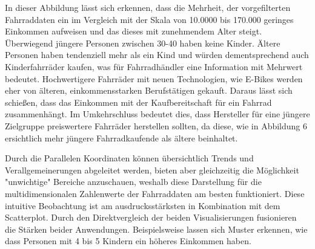 \documentclass[usegeometry=true]{scrartcl}
\begin{document}
\newline In dieser Abbildung lässt sich erkennen, dass die Mehrheit, der vorgefilterten Fahrraddaten ein im Vergleich mit der Skala von 10.0000 bis 170.000 geringes Einkommen aufweisen und das dieses mit zunehmendem Alter steigt. Überwiegend jüngere Personen zwischen 30-40 haben keine Kinder. Ältere Personen haben tendenziell mehr als ein Kind und würden dementsprechend auch Kinderfahrräder kaufen, was für Fahrradhändler eine Information mit Mehrwert bedeutet. Hochwertigere Fahrräder mit neuen Technologien, wie E-Bikes werden eher von älteren, einkommensstarken Berufstätigen gekauft. Daraus lässt sich schießen, dass das Einkommen mit der Kaufbereitschaft für ein Fahrrad zusammenhängt. Im Umkehrschluss bedeutet dies, dass Hersteller für eine jüngere Zielgruppe preiswertere Fahrräder herstellen sollten, da diese, wie in Abbildung 6 ersichtlich mehr jüngere Fahrradkaufende als ältere beinhaltet.  

Durch die Parallelen Koordinaten können übersichtlich Trends und Verallgemeinerungen abgeleitet werden, bieten aber gleichzeitig die Möglichkeit "unwichtige" Bereiche anzuschauen, weshalb diese Darstellung für die multidimensionalen Zahlenwerte der Fahrraddaten am besten funktioniert. Diese intuitive Beobachtung ist am ausdrucksstärksten in Kombination mit dem Scatterplot. Durch den Direktvergleich der beiden Visualisierungen fusionieren die Stärken beider Anwendungen. Beispielsweise lassen sich Muster erkennen, wie dass Personen mit 4 bis 5 Kindern ein höheres Einkommen haben.

 
\newpage
\end{document}
